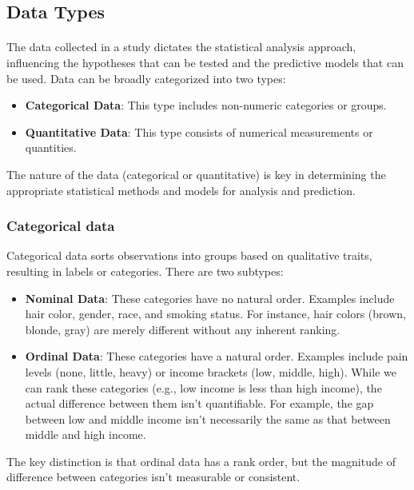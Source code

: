 \documentclass{article}
\begin{document}
\subsection{Data Types}
\paragraph{}
The data collected in a study dictates the statistical analysis approach, influencing the hypotheses that can be tested and the predictive models that can be used. Data can be broadly categorized into two types:

\begin{itemize}
    \item \textbf{Categorical Data}: This type includes non-numeric categories or groups.
    \item \textbf{Quantitative Data}: This type consists of numerical measurements or quantities.
\end{itemize}
The nature of the data (categorical or quantitative) is key in determining the appropriate statistical methods and models for analysis and prediction.

\subsubsection{Categorical data}

Categorical data sorts observations into groups based on qualitative traits, resulting in labels or categories. There are two subtypes:

\begin{itemize}
    \item \textbf{Nominal Data}: These categories have no natural order. Examples include hair color, gender, race, and smoking status. For instance, hair colors (brown, blonde, gray) are merely different without any inherent ranking.
    \item \textbf{Ordinal Data}: These categories have a natural order. Examples include pain levels (none, little, heavy) or income brackets (low, middle, high). While we can rank these categories (e.g., low income is less than high income), the actual difference between them isn't quantifiable. For example, the gap between low and middle income isn't necessarily the same as that between middle and high income.
\end{itemize}

The key distinction is that ordinal data has a rank order, but the magnitude of difference between categories isn't measurable or consistent.
\end{document}
